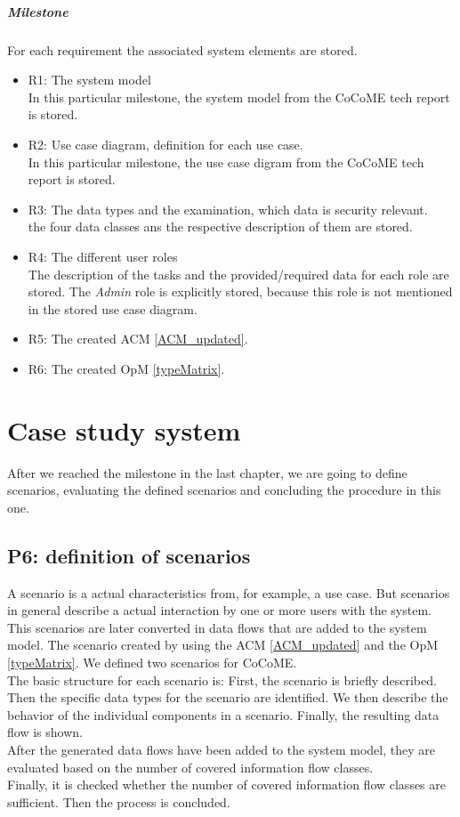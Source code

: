 \paragraph{Milestone}
For each requirement the associated system elements are stored.
\begin{itemize}
\item R1: The system model\\ In this particular milestone, the system model from the CoCoME tech report \cite{CoCoMETechReport} is stored.
\item R2: Use case diagram, definition for each use case.\\  In this particular milestone, the use case digram from the CoCoME tech report \cite{CoCoMETechReport} is stored.
\item R3: The data types and the examination, which data is security relevant. \\ the four data classes ans the respective description of them are stored.
\item R4: The different user roles\\ The description of the tasks and the provided/required data for each role are stored. The \textit{Admin} role is explicitly stored, because this role is not mentioned in the stored use case diagram.
\item R5: The created ACM \autoref{ACM_updated}.
\item R6: The created OpM \autoref{typeMatrix}.
\end{itemize}
\chapter{Case study system}
\label{ch:casestudysystem}
After we reached the milestone in the last chapter, we are going to define scenarios, evaluating the defined scenarios and concluding the procedure in this one.
\section{P6: definition of scenarios}
A scenario is a actual characteristics from, for example, a use case. But scenarios in general describe a actual interaction by one or more users with the system. This scenarios are later converted in data flows that are added to the system model. The scenario created by using the ACM \autoref{ACM_updated} and the OpM \autoref{typeMatrix}. We defined two scenarios for CoCoME.\\ The basic structure for each scenario is: First, the scenario is briefly described. Then the specific data types for the scenario are identified. We then describe the behavior of the individual components in a scenario. Finally, the resulting data flow is shown. \\
After the generated data flows have been added to the system model, they are evaluated based on the number of covered information flow classes. \\
Finally, it is checked whether the number of covered information flow classes are sufficient. Then the process is concluded.
